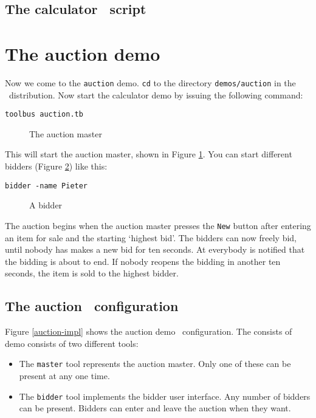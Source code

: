 \subsection{The calculator \TB\ script}


\section{The auction demo}

Now we come to the {\tt auction} demo. {\tt cd} to the directory
{\tt demos/auction} in the \TB\ distribution. Now start the calculator
demo by issuing the following command:

\begin{verbatim}
toolbus auction.tb
\end{verbatim}

\begin{figure}[htb]
\centerline{}
\caption{The auction master}
\label{auction-master}
\end{figure}

This will start the auction master, shown in Figure \ref{auction-master}. 
You can start different bidders (Figure \ref{auction-bidder})
like this:

\begin{verbatim}
bidder -name Pieter
\end{verbatim}

\begin{figure}[htb]
\centerline{}
\caption{A bidder}
\label{auction-bidder}
\end{figure}

The auction begins when the auction master presses the {\tt New}
button after entering an item for sale and the starting `highest
bid'. The bidders can now freely bid, until nobody has makes a new
bid for ten seconds. At everybody is notified that the bidding is
about to end. If nobody reopens the bidding in another ten seconds,
the item is sold to the highest bidder.

\subsection{The auction \TB\ configuration}


Figure \ref{auction-impl} shows the auction demo \TB\ configuration.
The consists of demo consists of two different tools:

\begin{itemize}
\item The {\tt master} tool represents the auction master. Only one
 of these can be present at any one time.
\item The {\tt bidder} tool implements the bidder user interface.
      Any number of bidders can be present. Bidders can enter and leave
      the auction when they want.
\end{itemize}

